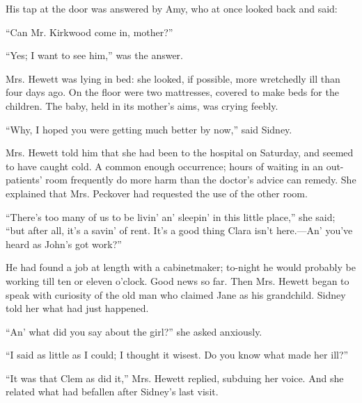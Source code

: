 His tap at the door was answered by Amy, who at once looked back and
said:

``Can Mr. Kirkwood come in, mother?''

``Yes; I want to see him,'' was the answer.

Mrs. Hewett was lying in bed: she looked, if possible, more wretchedly
ill than four days ago. On the floor were two mattresses, covered to
make beds for the children. The baby, held in its mother's aims, was
crying feebly.

``Why, I hoped you were getting much better by now,'' said Sidney.

Mrs. Hewett told him that she had been to the hospital on Saturday, and
seemed to have caught cold. A common enough occurrence; hours of waiting
in an out-patients' {\protect\hypertarget{151}{}{}}room frequently do
more harm than the doctor's advice can remedy. She explained that Mrs.
Peckover had requested the use of the other room.

``There's too many of us to be livin' an' sleepin' in this little
place,'' she said; ``but after all, it's a savin' of rent. It's a good
thing Clara isn't here.---An' you've heard as John's got work?''

He had found a job at length with a cabinetmaker; to-night he would
probably be working till ten or eleven o'clock. Good news so far. Then
Mrs. Hewett began to speak with curiosity of the old man who claimed
Jane as his grandchild. Sidney told her what had just happened.

``An' what did you say about the girl?'' she asked anxiously.

``I said as little as I could; I thought it wisest. Do you know what
made her ill?''

``It was that Clem as did it,'' Mrs. Hewett replied, subduing her voice.
And she related what had befallen after Sidney's last visit.

